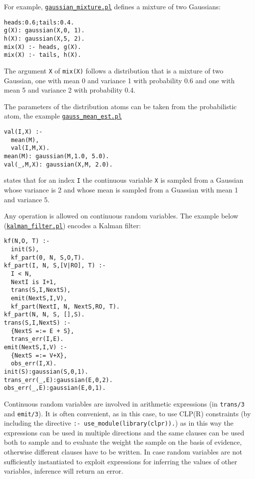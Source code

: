 For example, \href{http://cplint.eu/example/inference/gaussian_mixture.pl}{\texttt{gaussian\_mixture.pl}} defines a mixture of two Gaussians:
\begin{verbatim}
heads:0.6;tails:0.4.
g(X): gaussian(X,0, 1).
h(X): gaussian(X,5, 2).
mix(X) :- heads, g(X).
mix(X) :- tails, h(X).
\end{verbatim}
The argument \verb|X| of
\verb|mix(X)| follows a distribution that is a mixture of two Gaussian,
one with mean 0 and variance 1 with probability 0.6 and one with 
mean 5 and variance 2 with probability 0.4.

The parameters of the distribution atoms can be taken from the probabilistic
atom, the example \href{http://cplint.eu/example/inference/gauss_mean_est.pl}{\texttt{gauss\_mean\_est.pl}}
\begin{verbatim}
val(I,X) :-
  mean(M),
  val(I,M,X).
mean(M): gaussian(M,1.0, 5.0).
val(_,M,X): gaussian(X,M, 2.0).
\end{verbatim}
states that for an index \verb|I| the continuous variable \verb|X| is 
sampled from a Gaussian whose variance is 2 and whose mean is sampled from a Guassian with mean 1 and
variance 5.

Any operation is allowed on continuous random variables. The example below
(\href{http://cplint.eu/example/inference/kalman_filter.pl}{\texttt{kalman\_filter.pl}}) encodes a Kalman filter:
\begin{verbatim}
kf(N,O, T) :-
  init(S),
  kf_part(0, N, S,O,T).
kf_part(I, N, S,[V|RO], T) :-
  I < N,
  NextI is I+1,
  trans(S,I,NextS),
  emit(NextS,I,V),
  kf_part(NextI, N, NextS,RO, T).
kf_part(N, N, S, [],S).
trans(S,I,NextS) :-
  {NextS =:= E + S},
  trans_err(I,E).
emit(NextS,I,V) :-
  {NextS =:= V+X},
  obs_err(I,X).
init(S):gaussian(S,0,1).
trans_err(_,E):gaussian(E,0,2).
obs_err(_,E):gaussian(E,0,1).
\end{verbatim}
Continuous random variables are involved
in arithmetic expressions (in \verb|trans/3| and \verb|emit/3|). It
is often convenient, as in this case, to use CLP(R) constraints (by
including the directive \verb|:- use_module(library(clpr)).|) as 
in this way the expressions can be used in multiple directions and 
the same clauses can be used both to sample and to evaluate the weight the sample on the basis
of evidence,
otherwise different clauses have to be written.
In case random variables are not sufficiently instantiated to 
exploit expressions for inferring the values of other variables, 
inference will return an error.


